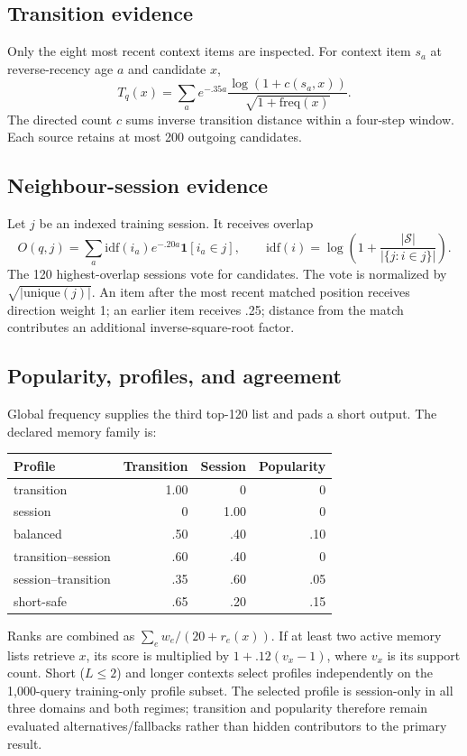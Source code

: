 \documentclass[runningheads]{llncs}
\begin{document}
\subsection{Transition evidence}
Only the eight most recent context items are inspected. For context item
$s_a$ at reverse-recency age $a$ and candidate $x$,
\begin{equation}
T_q(x)=\sum_a e^{-.35a}
\frac{\log(1+c(s_a,x))}{\sqrt{1+\mathrm{freq}(x)}}.
\end{equation}
The directed count $c$ sums inverse transition distance within a four-step
window. Each source retains at most 200 outgoing candidates.

\subsection{Neighbour-session evidence}
Let $j$ be an indexed training session. It receives overlap
\begin{equation}
O(q,j)=\sum_a \mathrm{idf}(i_a)e^{-.20a}
\mathbf1[i_a\in j],
\qquad
\mathrm{idf}(i)=\log\!\left(1+
\frac{|\mathcal S|}{|\{j:i\in j\}|}\right).
\end{equation}
The 120 highest-overlap sessions vote for candidates. The vote is normalized
by $\sqrt{|\mathrm{unique}(j)|}$. An item after the most recent matched
position receives direction weight 1; an earlier item receives .25; distance
from the match contributes an additional inverse-square-root factor.

\subsection{Popularity, profiles, and agreement}
Global frequency supplies the third top-120 list and pads a short output.
The declared memory family is:
\begin{center}\small
\begin{tabular}{lrrr}
\toprule
Profile & Transition & Session & Popularity\\
\midrule
transition & 1.00 & 0 & 0\\
session & 0 & 1.00 & 0\\
balanced & .50 & .40 & .10\\
transition--session & .60 & .40 & 0\\
session--transition & .35 & .60 & .05\\
short-safe & .65 & .20 & .15\\
\bottomrule
\end{tabular}
\end{center}
Ranks are combined as $\sum_e w_e/(20+r_e(x))$. If at least two active
memory lists retrieve $x$, its score is multiplied by
$1+.12(v_x-1)$, where $v_x$ is its support count. Short ($L\leq2$) and
longer contexts select profiles independently on the 1,000-query
training-only profile subset. The selected profile is session-only in all
three domains and both regimes; transition and popularity therefore remain
evaluated alternatives/fallbacks rather than hidden contributors to the
primary result.
\end{document}
